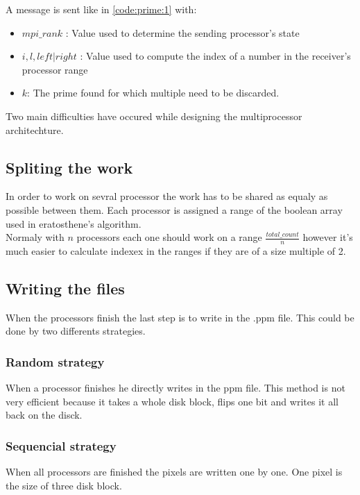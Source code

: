 \documentclass[a4paper,12pt]{article}
\begin{document}
A message is sent like in \ref{code:prime:1} with:

\begin{itemize}
	\item{$mpi\_rank$ :}
	Value used to determine the sending processor's state
	
	\item{$i,l, left|right$ :}
	Value used to compute the index of a number in the receiver's processor range
	\item{$k$:} 
	The prime found for which multiple need to be discarded.

\end{itemize}


Two main difficulties have occured while designing the multiprocessor architechture.

\subsection{Spliting the work}

In order to work on sevral processor the work has to be shared as equaly as possible between them. Each processor is assigned a range of the boolean array used in eratosthene's algorithm.\\Normaly with $n$ processors each one should work on a range $\frac{total\_count}{n}$ however it's much easier to calculate indexex in the ranges if they are of a size multiple of 2. 




\subsection{Writing the files}
When the processors finish the last step is to write in the .ppm file. This could be done by two differents strategies.

\subsubsection{Random strategy}
When a processor finishes he directly writes in the ppm file. This method is not very efficient because it takes a whole disk block, flips one bit and writes it all back on the disck.

\subsubsection{Sequencial strategy}
When all processors are finished the pixels are written one by one. One pixel is the size of three disk block.
\newpage\cleardoublepage{}
\end{document}
